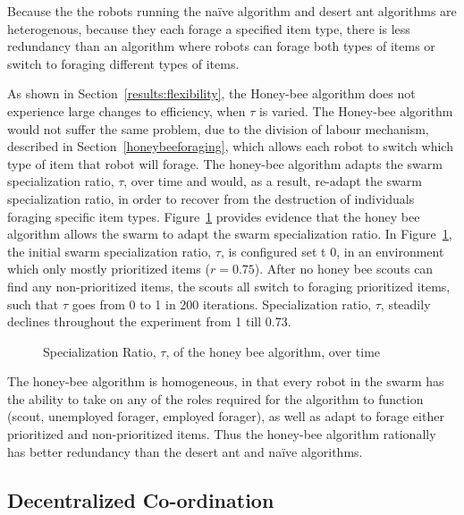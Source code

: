 Because the the robots running the na\"ive algorithm and desert ant algorithms are heterogenous, because they each forage a specified item type, there is less redundancy than an algorithm where robots can forage both types of items or switch to foraging different types of items.

As shown in Section~\ref{results:flexibility}, the Honey-bee algorithm does not experience large changes to efficiency, when $\tau$ is varied. The Honey-bee algorithm would not suffer the same problem, due to the division of labour mechanism, described in Section~\ref{honeybeeforaging}, which allows each robot to switch which type of item that robot will forage. The honey-bee algorithm adapts the swarm specialization ratio, $\tau$, over time and would, as a result, re-adapt the swarm specialization ratio, in order to recover from the destruction of individuals foraging specific item types. Figure~\ref{fig:specializationratioovertime} provides evidence that the honey bee algorithm allows the swarm to adapt the swarm specialization ratio. In Figure~\ref{fig:specializationratioovertime}, the initial swarm specialization ratio, $\tau$, is configured set t 0, in an environment which only mostly prioritized items ($r=0.75$). After no honey bee scouts can find any non-prioritized items, the scouts all switch to foraging prioritized items, such that $\tau$ goes from 0 to 1 in 200 iterations. Specialization ratio, $\tau$, steadily declines throughout the experiment from 1 till 0.73.

\begin{figure}[!htb]
\centering
\resizebox{\textwidth}{!}{}
\caption{Specialization Ratio, $\tau$, of the honey bee algorithm, over time}
\label{fig:specializationratioovertime}
\end{figure}


The honey-bee algorithm is homogeneous, in that every robot in the swarm has the ability to take on any of the roles required for the algorithm to function (scout, unemployed forager, employed forager), as well as adapt to forage either prioritized and non-prioritized items. Thus the honey-bee algorithm rationally has better redundancy than the desert ant and na\"ive algorithms.

\subsection{Decentralized Co-ordination}
\label{results:decentralizedcoordination}

